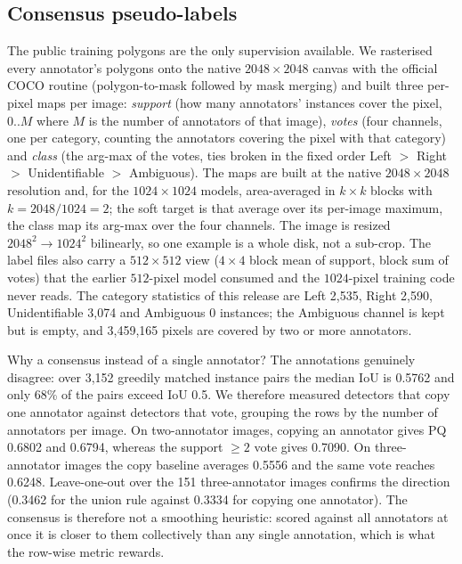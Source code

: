 \documentclass[sigconf]{acmart}
\begin{document}
\subsection{Consensus pseudo-labels}
\label{sec:consensus}
The public training polygons are the only supervision available. We rasterised
every annotator's polygons onto the native $2048\times2048$ canvas with the
official COCO routine (polygon-to-mask followed by mask merging) and built
three per-pixel maps per image:
\emph{support} (how many annotators' instances cover the pixel, $0..M$ where
$M$ is the number of annotators of that image), \emph{votes} (four channels,
one per category, counting the annotators covering the pixel with that
category) and \emph{class} (the arg-max of the votes, ties broken in the fixed
order Left $>$ Right $>$ Unidentifiable $>$ Ambiguous). The maps are built at
the native $2048\times2048$ resolution and, for the $1024\times1024$ models,
area-averaged in $k\times k$ blocks with $k=2048/1024=2$; the soft target is
that average over its per-image maximum, the class map its arg-max over the
four channels. The image is resized $2048^2\to1024^2$ bilinearly, so one
example is a whole disk, not a sub-crop. The label files also carry a
$512\times512$ view ($4\times4$ block mean of support, block sum of votes)
that the earlier $512$-pixel model consumed and the $1024$-pixel training code
never reads. The category statistics of this
release are Left 2{,}535, Right 2{,}590, Unidentifiable 3{,}074 and Ambiguous
0 instances; the Ambiguous channel is kept but is empty, and 3{,}459{,}165
pixels are covered by two or more annotators.

Why a consensus instead of a single annotator? The annotations genuinely
disagree: over 3{,}152 greedily matched instance pairs the median IoU is
0.5762 and only 68\% of the pairs exceed IoU 0.5. We therefore measured
detectors that copy one annotator against detectors that vote, grouping the
rows by the number of annotators per image. On two-annotator images, copying an
annotator gives PQ 0.6802 and 0.6794, whereas the support $\geq 2$ vote gives
0.7090. On three-annotator images the copy baseline averages 0.5556 and the
same vote reaches 0.6248. Leave-one-out over the 151 three-annotator images
confirms the direction (0.3462 for the union rule against 0.3334 for copying
one annotator). The consensus is therefore not a smoothing heuristic: scored
against all annotators at once it is closer to them collectively than any
single annotation, which is what the row-wise metric rewards.
\end{document}
